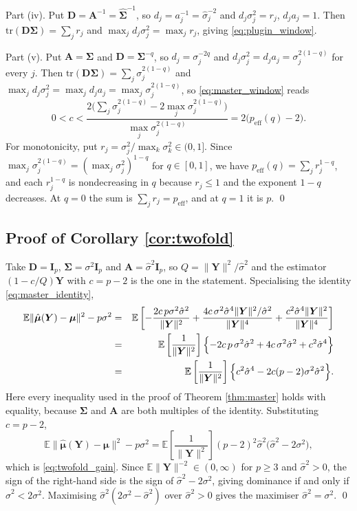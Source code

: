 \documentclass[pdflatex,sn-mathphys-num]{sn-jnl}%
\theoremstyle{thmstyleone}%
\theoremstyle{thmstyletwo}%
\theoremstyle{thmstylethree}%
\newenvironment{revblock}{}{}
\newcommand{\peff}{p_{\mathrm{eff}}}
\newcommand{\peffq}[1]{p_{\mathrm{eff}}(#1)}
\newcommand{\tr}{\mathrm{tr}}
\newcommand{\E}{\mathbb{E}}
\begin{document}
\begin{appendices}
Part (iv). Put $\bm D=\bm A^{-1}=\widehat{\bm\Sigma}^{-1}$, so $d_j=a^{-1}_j=\hat\sigma^{-2}_j$ and $d_j\sigma^2_j=r_j$, $d_ja_j=1$. Then $\tr(\bm D\bm\Sigma)=\sum_jr_j$ and $\max_jd_j\sigma^2_j=\max_jr_j$, giving \eqref{eq:plugin_window}.

Part (v). Put $\bm A=\bm\Sigma$ and $\bm D=\bm\Sigma^{-q}$, so $d_j=\sigma_j^{-2q}$ and $d_j\sigma^2_j=d_ja_j=\sigma_j^{2(1-q)}$ for every $j$. Then $\tr(\bm D\bm\Sigma)=\sum_j\sigma_j^{2(1-q)}$ and $\max_jd_j\sigma^2_j=\max_jd_ja_j=\max_j\sigma_j^{2(1-q)}$, so \eqref{eq:master_window} reads
\begin{equation}
0<c<\frac{2\bigl(\sum_j\sigma_j^{2(1-q)}-2\max_j\sigma_j^{2(1-q)}\bigr)}{\max_j\sigma_j^{2(1-q)}}=2\bigl(\peffq{q}-2\bigr).
\end{equation}
For monotonicity, put $r_j=\sigma^2_j/\max_k\sigma^2_k\in(0,1]$. Since $\max_j\sigma_j^{2(1-q)}=(\max_j\sigma^2_j)^{1-q}$ for $q\in[0,1]$, we have $\peffq{q}=\sum_jr_j^{1-q}$, and each $r_j^{1-q}$ is nondecreasing in $q$ because $r_j\le1$ and the exponent $1-q$ decreases. At $q=0$ the sum is $\sum_jr_j=\peff$, and at $q=1$ it is $p$.
\qed

\subsection*{Proof of Corollary \ref{cor:twofold}}

Take $\bm D=\bm I_p$, $\bm\Sigma=\sigma^2\bm I_p$ and $\bm A=\hat\sigma^2\bm I_p$, so $Q=\|\bm Y\|^2/\hat\sigma^2$ and the estimator $(1-c/Q)\bm Y$ with $c=p-2$ is the one in the statement. Specialising the identity \eqref{eq:master_identity},
\begin{eqnarray}
\E\|\hat{\bm\mu}(\bm Y)-\bm\mu\|^2-p\sigma^2
&=&
\E\left[
-\frac{2c\,p\sigma^2\hat\sigma^2}{\|\bm Y\|^2}
+\frac{4c\,\sigma^2\hat\sigma^{4}\|\bm Y\|^2/\hat\sigma^2}{\|\bm Y\|^{4}}
+\frac{c^{2}\hat\sigma^{4}\|\bm Y\|^2}{\|\bm Y\|^{4}}
\right]
\cr
&=&
\E\left[\frac{1}{\|\bm Y\|^2}\right]
\Bigl\{
-2c\,p\,\sigma^2\hat\sigma^2+4c\,\sigma^2\hat\sigma^2+c^{2}\hat\sigma^{4}
\Bigr\}
\cr
&=&
\E\left[\frac{1}{\|\bm Y\|^2}\right]
\Bigl\{
c^{2}\hat\sigma^{4}-2c(p-2)\sigma^2\hat\sigma^2
\Bigr\}.
\end{eqnarray}
Here every inequality used in the proof of Theorem \ref{thm:master} holds with equality, because $\bm\Sigma$ and $\bm A$ are both multiples of the identity. Substituting $c=p-2$,
\begin{equation}
\E\|\hat{\bm\mu}(\bm Y)-\bm\mu\|^2-p\sigma^2
=
\E\left[\frac{1}{\|\bm Y\|^2}\right]
(p-2)^2\hat\sigma^2\bigl(\hat\sigma^2-2\sigma^2\bigr),
\end{equation}
which is \eqref{eq:twofold_gain}. Since $\E\|\bm Y\|^{-2}\in(0,\infty)$ for $p\ge3$ and $\hat\sigma^2>0$, the sign of the right-hand side is the sign of $\hat\sigma^2-2\sigma^2$, giving dominance if and only if $\hat\sigma^2<2\sigma^2$. Maximising $\hat\sigma^2(2\sigma^2-\hat\sigma^2)$ over $\hat\sigma^2>0$ gives the maximiser $\hat\sigma^2=\sigma^2$. \qed


\end{appendices}
\end{document}
